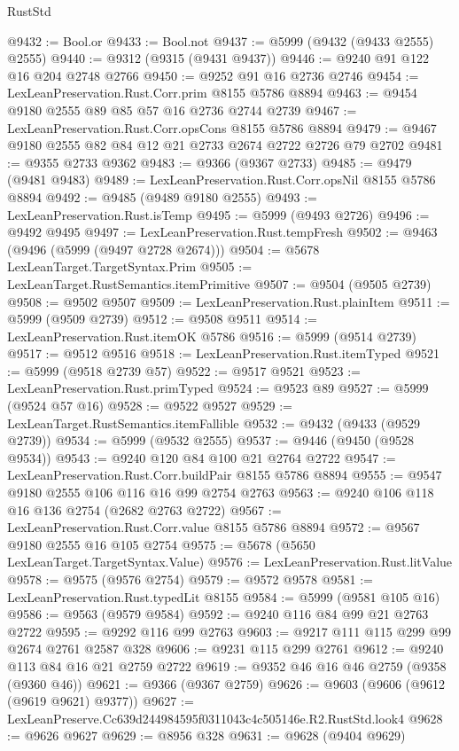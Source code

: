 \begin{lexlean}{RustStd}
\begin{coremodule}
@9432 := Bool.or
@9433 := Bool.not
@9437 := @5999 (@9432 (@9433 @2555) @2555)
@9440 := @9312 (@9315 (@9431 @9437))
@9446 := @9240 @91 @122 @16 @204 @2748 @2766
@9450 := @9252 @91 @16 @2736 @2746
@9454 := LexLeanPreservation.Rust.Corr.prim @8155 @5786 @8894
@9463 := @9454 @9180 @2555 @89 @85 @57 @16 @2736 @2744 @2739
@9467 := LexLeanPreservation.Rust.Corr.opsCons @8155 @5786 @8894
@9479 := @9467 @9180 @2555 @82 @84 @12 @21 @2733 @2674 @2722 @2726 @79 @2702
@9481 := @9355 @2733 @9362
@9483 := @9366 (@9367 @2733)
@9485 := @9479 (@9481 @9483)
@9489 := LexLeanPreservation.Rust.Corr.opsNil @8155 @5786 @8894
@9492 := @9485 (@9489 @9180 @2555)
@9493 := LexLeanPreservation.Rust.isTemp
@9495 := @5999 (@9493 @2726)
@9496 := @9492 @9495
@9497 := LexLeanPreservation.Rust.tempFresh
@9502 := @9463 (@9496 (@5999 (@9497 @2728 @2674)))
@9504 := @5678 LexLeanTarget.TargetSyntax.Prim
@9505 := LexLeanTarget.RustSemantics.itemPrimitive
@9507 := @9504 (@9505 @2739)
@9508 := @9502 @9507
@9509 := LexLeanPreservation.Rust.plainItem
@9511 := @5999 (@9509 @2739)
@9512 := @9508 @9511
@9514 := LexLeanPreservation.Rust.itemOK @5786
@9516 := @5999 (@9514 @2739)
@9517 := @9512 @9516
@9518 := LexLeanPreservation.Rust.itemTyped
@9521 := @5999 (@9518 @2739 @57)
@9522 := @9517 @9521
@9523 := LexLeanPreservation.Rust.primTyped
@9524 := @9523 @89
@9527 := @5999 (@9524 @57 @16)
@9528 := @9522 @9527
@9529 := LexLeanTarget.RustSemantics.itemFallible
@9532 := @9432 (@9433 (@9529 @2739))
@9534 := @5999 (@9532 @2555)
@9537 := @9446 (@9450 (@9528 @9534))
@9543 := @9240 @120 @84 @100 @21 @2764 @2722
@9547 := LexLeanPreservation.Rust.Corr.buildPair @8155 @5786 @8894
@9555 := @9547 @9180 @2555 @106 @116 @16 @99 @2754 @2763
@9563 := @9240 @106 @118 @16 @136 @2754 (@2682 @2763 @2722)
@9567 := LexLeanPreservation.Rust.Corr.value @8155 @5786 @8894
@9572 := @9567 @9180 @2555 @16 @105 @2754
@9575 := @5678 (@5650 LexLeanTarget.TargetSyntax.Value)
@9576 := LexLeanPreservation.Rust.litValue
@9578 := @9575 (@9576 @2754)
@9579 := @9572 @9578
@9581 := LexLeanPreservation.Rust.typedLit @8155
@9584 := @5999 (@9581 @105 @16)
@9586 := @9563 (@9579 @9584)
@9592 := @9240 @116 @84 @99 @21 @2763 @2722
@9595 := @9292 @116 @99 @2763
@9603 := @9217 @111 @115 @299 @99 @2674 @2761 @2587 @328
@9606 := @9231 @115 @299 @2761
@9612 := @9240 @113 @84 @16 @21 @2759 @2722
@9619 := @9352 @46 @16 @46 @2759 (@9358 (@9360 @46))
@9621 := @9366 (@9367 @2759)
@9626 := @9603 (@9606 (@9612 (@9619 @9621) @9377))
@9627 := LexLeanPreserve.Cc639d244984595f0311043c4c505146e.R2.RustStd.look4
@9628 := @9626 @9627
@9629 := @8956 @328
@9631 := @9628 (@9404 @9629)

\end{coremodule}
\end{lexlean}
